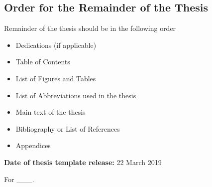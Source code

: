 \begin{instructional}
\section*{Order for the Remainder of the Thesis}
\noindent
    Remainder of the thesis should be in the following order

    \begin{itemize}
        \item Dedications (if applicable)
        \item Table of Contents
        \item List of Figures and Tables
        \item List of Abbreviations used in the thesis
        \item Main text of the thesis
        \item Bibliography or List of References
        \item Appendices
    \end{itemize}

\noindent
\textbf{Date of thesis template release:} 22 March 2019
\end{instructional}
\clearpage


	\rmfamily
	\normalfont

	\begin{vplace}[1]
		\begin{center}
			For \_\_\_.
		\end{center}
	\end{vplace}


\clearpage
\pagestyle{headings}


\tableofcontents
	\clearpage
\listoffigures
	\clearpage
\listoftables
\newpage

